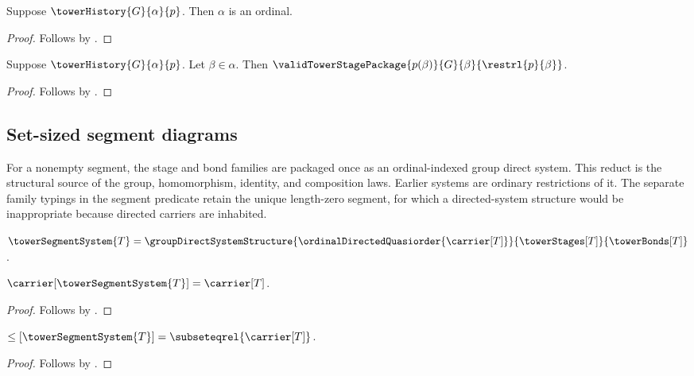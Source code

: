 \begin{proposition}\label{tower_history_ordinal}
    Suppose $\towerHistory{G}{\alpha}{p}$.
    Then $\alpha$ is an ordinal.
\end{proposition}
\begin{proof}
    Follows by .
\end{proof}

\begin{proposition}\label{tower_history_value_valid}
    Suppose $\towerHistory{G}{\alpha}{p}$.
    Let $\beta\in\alpha$.
    Then $\validTowerStagePackage
        {p(\beta)}{G}{\beta}{\restrl{p}{\beta}}$.
\end{proposition}
\begin{proof}
    Follows by .
\end{proof}

\subsection{Set-sized segment diagrams}

For a nonempty segment, the stage and bond families are packaged once as an
ordinal-indexed group direct system.  This reduct is the structural source of
the group, homomorphism, identity, and composition laws.  Earlier systems are
ordinary restrictions of it.  The separate family typings in the segment
predicate retain the unique length-zero segment, for which a directed-system
structure would be inappropriate because directed carriers are inhabited.

\begin{abbreviation}\label{tower_segment_system}
    $\towerSegmentSystem{T}=
        \groupDirectSystemStructure
            {\ordinalDirectedQuasiorder{\carrier[T]}}
            {\towerStages[T]}
            {\towerBonds[T]}$.
\end{abbreviation}

\begin{proposition}\label{tower_segment_system_carrier}
    $\carrier[\towerSegmentSystem{T}]=\carrier[T]$.
\end{proposition}
\begin{proof}
    Follows by
        .
\end{proof}

\begin{proposition}\label{tower_segment_system_order}
    $\leq[\towerSegmentSystem{T}]=
        \subseteqrel{\carrier[T]}$.
\end{proposition}
\begin{proof}
    Follows by
        .
\end{proof}

